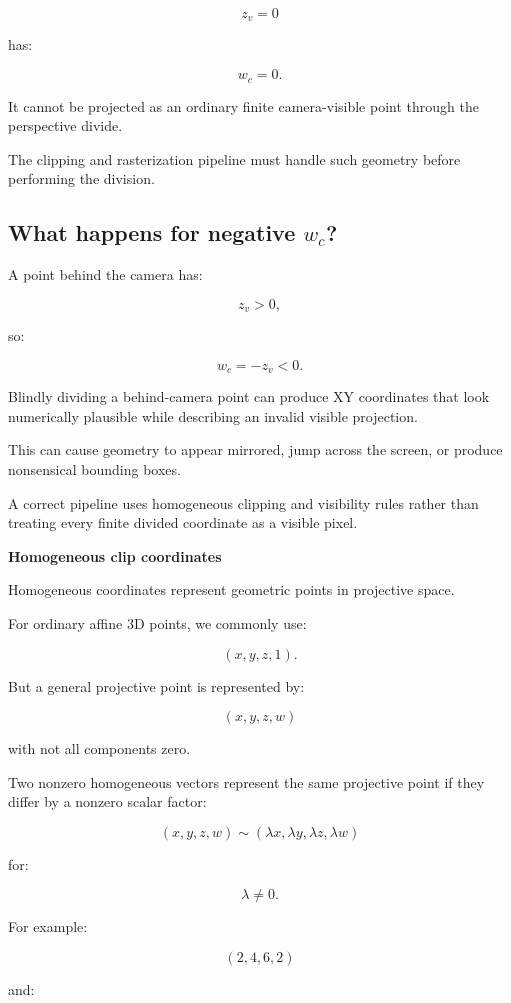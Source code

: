 \[
 z_v=0
\]

has:

\[
 w_c=0.
\]

It cannot be projected as an ordinary finite camera-visible point through the perspective divide.

The clipping and rasterization pipeline must handle such geometry before performing the division.

\subsection{\texorpdfstring{What happens for negative \(w_c\)?}{What happens for negative w\_c?}}\label{02-foundations-ii-ch033-what-happens-for-negative-w_c}

A point behind the camera has:

\[
 z_v>0,
\]

so:

\[
 w_c=-z_v<0.
\]

Blindly dividing a behind-camera point can produce XY coordinates that look numerically plausible while describing an invalid visible projection.

This can cause geometry to appear mirrored, jump across the screen, or produce nonsensical bounding boxes.

A correct pipeline uses homogeneous clipping and visibility rules rather than treating every finite divided coordinate as a visible pixel.

\textbf{Homogeneous clip coordinates}

Homogeneous coordinates represent geometric points in projective space.

For ordinary affine 3D points, we commonly use:

\[
 (x,y,z,1).
\]

But a general projective point is represented by:

\[
 \boxed{ (x,y,z,w) }
\]

with not all components zero.

Two nonzero homogeneous vectors represent the same projective point if they differ by a nonzero scalar factor:

\[
 \boxed{ (x,y,z,w) \sim (\lambda x,\lambda y,\lambda z,\lambda w) }
\]

for:

\[
 \lambda\ne0.
\]

For example:

\[
 (2,4,6,2)
\]

and:


